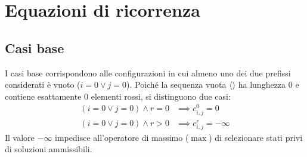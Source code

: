 \section{Equazioni di ricorrenza}

\subsection{Casi base}
I casi base corrispondono alle configurazioni in cui almeno uno dei due prefissi considerati è vuoto ($i = 0 \lor j = 0$). Poiché la sequenza vuota $\langle \rangle$ ha lunghezza $0$ e contiene esattamente $0$ elementi rossi, si distinguono due casi:
\begin{align*}
    (i = 0 \lor j = 0) \land r = 0 &\implies c_{i,j}^0 = 0 \\
    (i = 0 \lor j = 0) \land r > 0 &\implies c_{i,j}^r = -\infty
\end{align*}
Il valore $-\infty$ impedisce all'operatore di massimo ($\max$) di selezionare stati privi di soluzioni ammissibili.

